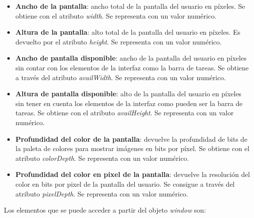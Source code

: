 \begin{itemize} 
    \item \textbf{Ancho de la pantalla}: ancho total de la pantalla del usuario en píxeles. Se obtiene con el atributo \textit{width}. Se representa con un valor numérico.
    \item \textbf{Altura de la pantalla}: alto total de la pantalla del usuario en píxeles. Es devuelto por el atributo \textit{height}. Se representa con un valor numérico.
    \item \textbf{Ancho de pantalla disponible}: ancho de la pantalla del usuario en píxeles sin contar con los elementos de la interfaz como la barra de tareas. Se obtiene a través del atributo \textit{availWidth}. Se representa con un valor numérico.
    \item \textbf{Altura de pantalla disponible}: alto de la pantalla del usuario en píxeles sin tener en cuenta los elementos de la interfaz como pueden ser la barra de tareas. Se obtiene con el atributo \textit{availHeight}. Se representa con un valor numérico.
    \item \textbf{Profundidad del color de la pantalla}: devuelve la profundidad de bits de la paleta de colores para mostrar imágenes en bits por píxel. Se obtiene con el atributo \textit{colorDepth}. Se representa con un valor numérico.
    \item \textbf{Profundidad del color en pixel de la pantalla}: devuelve la resolución del color en bits por pixel de la pantalla del usuario. Se consigue a través del atributo \textit{pixelDepth}. Se representa con un valor numérico.
\end{itemize}
\noindent  Los elementos que se puede acceder a partir del objeto \textit{window}\cite{window} son:
